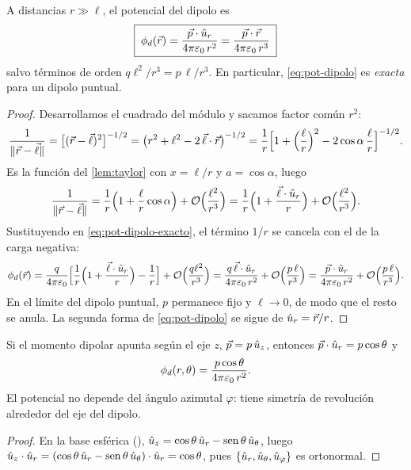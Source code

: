 \begin{proposicion}\label{prop:pot-dipolo}
A distancias $r\gg\ell$, el potencial del dipolo es
\begin{equation}\label{eq:pot-dipolo}
  \boxed{\;\phi_{d}(\vec{r})=\frac{\vec{p}\cdot\hat{u}_{r}}{4\pi\varepsilon_{0}\,r^{2}}=\frac{\vec{p}\cdot\vec{r}}{4\pi\varepsilon_{0}\,r^{3}}\;}
\end{equation}
salvo términos de orden $q\ell^{2}/r^{3}=p\,\ell/r^{3}$. En particular, \cref{eq:pot-dipolo} es \emph{exacta} para un dipolo puntual.
\end{proposicion}
\begin{proof}
Desarrollamos el cuadrado del módulo y sacamos factor común $r^{2}$:
\[
  \frac{1}{\lVert \vec{r}-\vec{\ell}\rVert}=\bigl[(\vec{r}-\vec{\ell})^{2}\bigr]^{-1/2}=\bigl(r^{2}+\ell^{2}-2\,\vec{\ell}\cdot\vec{r}\bigr)^{-1/2}
  =\frac{1}{r}\Bigl[1+\Bigl(\frac{\ell}{r}\Bigr)^{2}-2\cos\alpha\,\frac{\ell}{r}\Bigr]^{-1/2}.
\]
Es la función del \cref{lem:taylor} con $x=\ell/r$ y $a=\cos\alpha$, luego
\[
  \frac{1}{\lVert \vec{r}-\vec{\ell}\rVert}=\frac{1}{r}\Bigl(1+\frac{\ell}{r}\cos\alpha\Bigr)+\mathcal{O}\Bigl(\frac{\ell^{2}}{r^{3}}\Bigr)
  =\frac{1}{r}\Bigl(1+\frac{\vec{\ell}\cdot\hat{u}_{r}}{r}\Bigr)+\mathcal{O}\Bigl(\frac{\ell^{2}}{r^{3}}\Bigr).
\]
Sustituyendo en \cref{eq:pot-dipolo-exacto}, el término $1/r$ se cancela con el de la carga negativa:
\[
  \phi_{d}(\vec{r})=\frac{q}{4\pi\varepsilon_{0}}\Bigl[\frac{1}{r}\Bigl(1+\frac{\vec{\ell}\cdot\hat{u}_{r}}{r}\Bigr)-\frac{1}{r}\Bigr]+\mathcal{O}\Bigl(\frac{q\ell^{2}}{r^{3}}\Bigr)
  =\frac{q\,\vec{\ell}\cdot\hat{u}_{r}}{4\pi\varepsilon_{0}\,r^{2}}+\mathcal{O}\Bigl(\frac{p\,\ell}{r^{3}}\Bigr)=\frac{\vec{p}\cdot\hat{u}_{r}}{4\pi\varepsilon_{0}\,r^{2}}+\mathcal{O}\Bigl(\frac{p\,\ell}{r^{3}}\Bigr).
\]
En el límite del dipolo puntual, $p$ permanece fijo y $\ell\to0$, de modo que el resto se anula. La segunda forma de \cref{eq:pot-dipolo} se
sigue de $\hat{u}_{r}=\vec{r}/r$.
\end{proof}

\begin{corolario}\label{cor:pot-dipolo-z}
Si el momento dipolar apunta según el eje $z$, $\vec{p}=p\,\hat{u}_{z}$, entonces $\vec{p}\cdot\hat{u}_{r}=p\cos\theta$ y
\begin{equation}\label{eq:pot-dipolo-z}
  \phi_{d}(r,\theta)=\frac{p\cos\theta}{4\pi\varepsilon_{0}\,r^{2}} .
\end{equation}
El potencial no depende del ángulo azimutal $\varphi$: tiene simetría de revolución alrededor del eje del dipolo.
\end{corolario}
\begin{proof}
En la base esférica (), $\hat{u}_{z}=\cos\theta\,\hat{u}_{r}-\operatorname{sen}\theta\,\hat{u}_{\theta}$, luego
$\hat{u}_{z}\cdot\hat{u}_{r}=(\cos\theta\,\hat{u}_{r}-\operatorname{sen}\theta\,\hat{u}_{\theta})\cdot\hat{u}_{r}=\cos\theta$, pues $\{\hat{u}_{r},\hat{u}_{\theta},\hat{u}_{\varphi}\}$ es ortonormal.
\end{proof}

